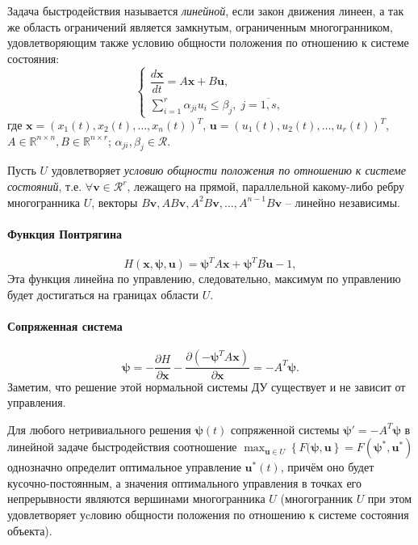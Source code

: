 
\begin{definition}
  Задача быстродействия называется \emph{линейной}, если закон движения линеен, а так же область ограничений является замкнутым, ограниченным многогранником, удовлетворяющим также условию общности положения по отношению к системе состояния:
  \[
    \begin{cases}
      \dfrac{d\mathbf{x}}{dt} = A\mathbf{x} + B\mathbf{u}, \\
      \sum_{i=1}^r \alpha_{ji} u_i \leqslant \beta_j, \; j=\overline{1, s},
    \end{cases}
  \]
  где $\mathbf{x} = \left( x_1(t), x_2(t), \dots, x_n(t) \right)^T$,
  $\mathbf{u} = \left( u_1(t), u_2(t), \dots, u_r(t) \right)^T$,
  $A \in \mathbb{R}^{n\times n}, B \in \mathbb{R}^{n\times r}$;
  $\alpha_{ji}, \beta_j \in \mathcal{R}$. 
\end{definition}

\begin{definition}
  Пусть $U$ удовлетворяет \emph{условию общности положения по отношению к системе состояний}, т.е. 
  $\forall \mathbf{v}\in\mathcal{R}^r$, лежащего на прямой, параллельной какому-либо ребру
  многогранника $U$, векторы
  $B\mathbf{v}, AB\mathbf{v}, A^2B\mathbf{v}, \dots, A^{n-1}B\mathbf{v}$ -- линейно независимы.
\end{definition}

\paragraph{Функция Понтрягина}
\[
  H(\mathbf{x}, \mathbf{\psi}, \mathbf{u}) = \mathbf{\psi}^T A \mathbf{x} + \mathbf{\psi}^T B \mathbf{u} - 1,
\]
Эта функция линейна по управлению, следовательно, максимум по управлению будет достигаться на границах области $U$.


\paragraph{Сопряженная система}
\[
  \mathbf{\psi} = - \dfrac{\partial H}{\partial \mathbf{x}} - \dfrac{\partial (- \mathbf{\psi}^T A \mathbf{x})}{\partial \mathbf{x}} = - A^T \mathbf{\psi}.
\]
Заметим, что решение этой нормальной системы ДУ существует и не зависит от управления.

\begin{theorem}
  Для любого нетривиального решения $\mathbf{\psi}(t)$ сопряженной системы
  $\mathbf{\psi}' = -A^T \mathbf{\psi}$ в линейной задаче быстродействия соотношение
  $\max_{\mathbf{u} \in U} \left\{ F(\mathbf{\psi}, \mathbf{u} \right\} =
  F(\mathbf{\psi}^*, \mathbf{u}^*)$ однозначно определит оптимальное управление $\mathbf{u}^*(t)$,
  причём оно будет кусочно-постоянным, а значения оптимального управления в точках его
  непрерывности являются вершинами многогранника $U$ (многогранник $U$ при этом удовлетворяет
  уcловию общности положения по отношению к системе состояния объекта).
\end{theorem}

